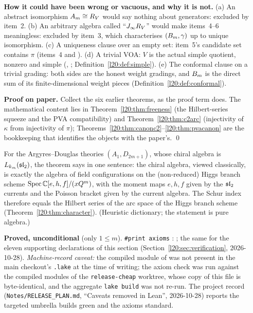 \begin{dictionary}
\textbf{How it could have been wrong or vacuous, and why it is not.} (a) An abstract isomorphism $A_m\cong R_V$ would say
nothing about generators: excluded by item~2. (b) An arbitrary algebra called ``$J_\infty R_V$'' would make items~4--6
meaningless: excluded by item~3, which characterises $(B_m,\gamma)$ up to unique isomorphism. (c) A uniqueness clause over
an empty set: item~5's candidate set contains $\pi$ (items~4 and ). (d) A trivial VOA: $V$ is the actual
simple quotient, nonzero and simple (, ; Definition~\ref{l20:def:simple}).
(e) The conformal clause on a trivial grading: both sides are the honest weight gradings, and $B_m$ is the direct sum of
its finite-dimensional weight pieces (Definition~\ref{l20:def:conformal}).
\end{dictionary}

\textbf{Proof on paper.} Collect the six earlier theorems, as the proof term does. The mathematical content lies in
Theorem~\ref{l20:thm:freeness} (the Hilbert-series squeeze and the PVA compatibility) and Theorem~\ref{l20:thm:c2arc}
(injectivity of $\kappa$ from injectivity of $\pi$); Theorems~\ref{l20:thm:canonc2}--\ref{l20:thm:pvacanon} are the
bookkeeping that identifies the objects with the paper's. \qed

\begin{physics}
For the Argyres--Douglas theories $(A_1,D_{2m+1})$, whose chiral algebra is $L_{k_m}(\mathfrak{sl}_2)$, the theorem says in one
sentence: the chiral algebra, viewed classically, is exactly the algebra of field configurations on the (non-reduced) Higgs
branch scheme $\operatorname{Spec}{\mathbb{C}}[e,h,f]/(xQ^m)$, with the moment maps $e,h,f$ given by the $\mathfrak{sl}_2$ currents
and the Poisson bracket given by the current algebra. The Schur index therefore equals the Hilbert series of the arc space of
the Higgs branch scheme (Theorem~\ref{l20:thm:character}). (Heuristic dictionary; the statement is pure algebra.)
\end{physics}

\begin{status}
\textbf{Proved, unconditional} (only $1\le m$). \texttt{\#print axioms} :
; the same for the eleven supporting declarations of this section
(Section~\ref{l20:sec:verification}, 2026-10-28). \emph{Machine-record caveat:} the compiled module of
 was not present in the main checkout's
\texttt{.lake} at the time of writing; the axiom check was run against the compiled modules of the \texttt{release-cheap}
worktree, whose copy of this file is byte-identical, and the aggregate \texttt{lake build} was not re-run. The project record
(\texttt{Notes/RELEASE\_PLAN.md}, ``Caveats removed in Lean'', 2026-10-28) reports the targeted umbrella builds green and the
axioms standard.
\end{status}

